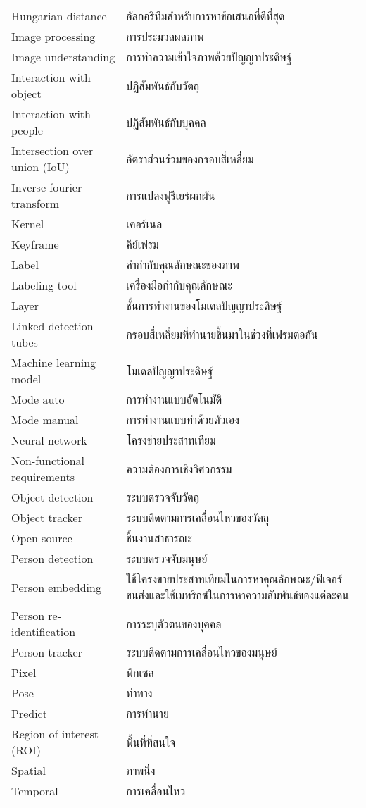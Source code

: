 \begin{abbreviations}
\begin{tabular*}{\textwidth}{@{}p{}p{}@{}}
	Hungarian distance & อัลกอริทึมสำหรับการหาข้อเสนอที่ดีที่สุด\\
        Image processing   & การประมวลผลภาพ\\
        Image understanding & การทำความเข้าใจภาพด้วยปัญญาประดิษฐ์\\
        Interaction with object  &  ปฏิสัมพันธ์กับวัตถุ\\
        Interaction with people & ปฏิสัมพันธ์กับบุคคล\\
	Intersection over union (IoU) & อัตราส่วนร่วมของกรอบสี่เหลี่ยม\\
	Inverse fourier transform & การแปลงฟูรีเยร์ผกผัน\\
	Kernel & เคอร์เนล\\
	Keyframe & คีย์เฟรม\\
	Label & คำกำกับคุณลักษณะของภาพ\\
	Labeling tool & เครื่องมือกำกับคุณลักษณะ\\
	Layer & ชั้นการทำงานของโมเดลปัญญาประดิษฐ์\\
	Linked detection tubes & กรอบสี่เหลี่ยมที่ทำนายขึ้นมาในช่วงที่เฟรมต่อกัน\\
	Machine learning model & โมเดลปัญญาประดิษฐ์\\
	Mode auto & การทำงานแบบอัตโนมัติ\\
	Mode manual & การทำงานแบบทำด้วยตัวเอง\\
	Neural network & โครงข่ายประสาทเทียม\\
	Non-functional requirements & ความต้องการเชิงวิศวกรรม\\
	Object detection & ระบบตรวจจับวัตถุ\\
	Object tracker & ระบบติดตามการเคลื่อนไหวของวัตถุ\\
	Open source & ชิ้นงานสาธารณะ\\
	Person detection & ระบบตรวจจับมนุษย์\\
	Person embedding & ใช้โครงขายประสาทเทียมในการหาคุณลักษณะ/ฟีเจอร์ขนส่งและใช้เมทริกซ์ในการหาความสัมพันธ์ของแต่ละคน\\
	Person re-identification & การระบุตัวตนของบุคคล\\
	Person tracker & ระบบติดตามการเคลื่อนไหวของมนุษย์\\
	Pixel & พิกเซล\\
	Pose & ท่าทาง\\
	Predict & การทำนาย\\
	Region of interest (ROI) & พื้นที่ที่สนใจ\\
	Spatial & ภาพนิ่ง\\
	Temporal & การเคลื่อนไหว\\

\end{tabular*}
\end{abbreviations}
